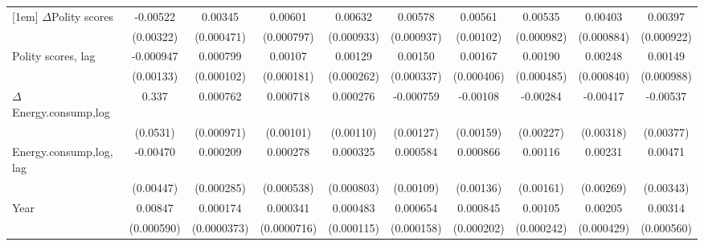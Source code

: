 \begin{table}[htbp]
\begin{tabular}{l*{9}{c}}
[1em]
$\Delta$Polity scores           &    -0.00522         &     0.00345\sym{***}&     0.00601\sym{***}&     0.00632\sym{***}&     0.00578\sym{***}&     0.00561\sym{***}&     0.00535\sym{***}&     0.00403\sym{***}&     0.00397\sym{***}\\
                    &   (0.00322)         &  (0.000471)         &  (0.000797)         &  (0.000933)         &  (0.000937)         &   (0.00102)         &  (0.000982)         &  (0.000884)         &  (0.000922)         \\
[1em]
Polity scores, lag            &   -0.000947         &    0.000799\sym{***}&     0.00107\sym{***}&     0.00129\sym{***}&     0.00150\sym{***}&     0.00167\sym{***}&     0.00190\sym{***}&     0.00248\sym{***}&     0.00149         \\
                    &   (0.00133)         &  (0.000102)         &  (0.000181)         &  (0.000262)         &  (0.000337)         &  (0.000406)         &  (0.000485)         &  (0.000840)         &  (0.000988)         \\
[1em]
$\Delta$Energy.consump,log            &       0.337\sym{***}&    0.000762         &    0.000718         &    0.000276         &   -0.000759         &    -0.00108         &    -0.00284         &    -0.00417         &    -0.00537         \\
                    &    (0.0531)         &  (0.000971)         &   (0.00101)         &   (0.00110)         &   (0.00127)         &   (0.00159)         &   (0.00227)         &   (0.00318)         &   (0.00377)         \\
[1em]
Energy.consump,log, lag            &    -0.00470         &    0.000209         &    0.000278         &    0.000325         &    0.000584         &    0.000866         &     0.00116         &     0.00231         &     0.00471         \\
                    &   (0.00447)         &  (0.000285)         &  (0.000538)         &  (0.000803)         &   (0.00109)         &   (0.00136)         &   (0.00161)         &   (0.00269)         &   (0.00343)         \\
[1em]
Year                &     0.00847\sym{***}&    0.000174\sym{***}&    0.000341\sym{***}&    0.000483\sym{***}&    0.000654\sym{***}&    0.000845\sym{***}&     0.00105\sym{***}&     0.00205\sym{***}&     0.00314\sym{***}\\
                    &  (0.000590)         & (0.0000373)         & (0.0000716)         &  (0.000115)         &  (0.000158)         &  (0.000202)         &  (0.000242)         &  (0.000429)         &  (0.000560)         \\

\end{tabular}
\end{table}
